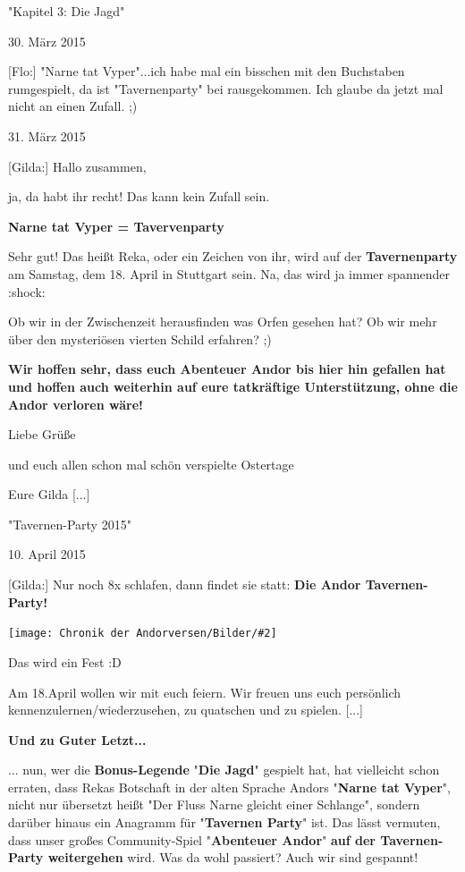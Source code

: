 \documentclass[10pt, a4paper, oneside]{book}
\newcommand{\bildmitts}[2][height=0.32\textwidth,width=0.48\textwidth,keepaspectratio]{%
    \begin{center}
        \texttt{[image: Chronik der Andorversen/Bilder/\#2]}
    \end{center}
}
\begin{document}
\begin{multicols}{2}
\begin{center}
    "Kapitel 3: Die Jagd"
    
    30. März 2015
\end{center}

[Flo:] "Narne tat Vyper"...ich habe mal ein bisschen mit den Buchstaben rumgespielt, da ist "Tavernenparty" bei rausgekommen. Ich glaube da jetzt mal nicht an einen Zufall. ;)


\begin{center}
    31. März 2015
\end{center}

[Gilda:] Hallo zusammen,

ja, da habt ihr recht! Das kann kein Zufall sein.

\textbf{Narne tat Vyper = Tavervenparty}

Sehr gut! Das heißt Reka, oder ein Zeichen von ihr, wird auf der \textbf{Tavernenparty} am Samstag, dem 18. April in Stuttgart sein. Na, das wird ja immer spannender :shock:

Ob wir in der Zwischenzeit herausfinden was Orfen gesehen hat? Ob wir mehr über den mysteriösen vierten Schild erfahren? ;)

\textbf{Wir hoffen sehr, dass euch Abenteuer Andor bis hier hin gefallen hat und hoffen auch weiterhin auf eure tatkräftige Unterstützung, ohne die Andor verloren wäre!}


Liebe Grüße

und euch allen schon mal schön verspielte Ostertage

Eure Gilda [...]



\begin{center}
    "Tavernen-Party 2015"
    
    10. April 2015
\end{center}

[Gilda:] Nur noch 8x schlafen, dann findet sie statt: \textbf{Die Andor Tavernen-Party!}

\bildmitts{AA2015 Tavernen-Party 1.jpeg}

Das wird ein Fest :D

Am 18.April wollen wir mit euch feiern. Wir freuen uns euch persönlich kennenzulernen/wiederzusehen, zu quatschen und zu spielen. [...] 

\textbf{Und zu Guter Letzt...}

... nun, wer die \textbf{Bonus-Legende} "\textbf{Die Jagd}" gespielt hat, hat vielleicht schon erraten, dass Rekas Botschaft in der alten Sprache Andors "\textbf{Narne tat Vyper}", nicht nur übersetzt heißt "Der Fluss Narne gleicht einer Schlange", sondern darüber hinaus ein Anagramm für "\textbf{Tavernen Party}" ist. Das lässt vermuten, dass unser großes Community-Spiel "\textbf{Abenteuer Andor}" \textbf{auf der Tavernen-Party weitergehen} wird. Was da wohl passiert? Auch wir sind gespannt!


\end{multicols}
\end{document}
